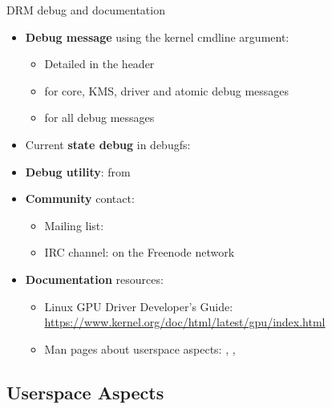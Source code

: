 \begin{frame}[fragile]{DRM debug and documentation}
  \begin{itemize}
  \item \textbf{Debug message} using the  kernel cmdline argument:
    \begin{itemize}
    \item Detailed in the  header
    \item {} for core, KMS, driver and atomic debug messages
    \item {} for all debug messages
    \end{itemize}
  \item Current \textbf{state debug} in debugfs:\\
  \item \textbf{Debug utility}:  from 
  \item \textbf{Community} contact:
    \begin{itemize}
    \item Mailing list: 
    \item IRC channel:  on the Freenode network
    \end{itemize}
  \item \textbf{Documentation} resources:
    \begin{itemize}
    \item Linux GPU Driver Developer’s Guide: \url{https://www.kernel.org/doc/html/latest/gpu/index.html}
    \item Man pages about userspace aspects: , , 
    \end{itemize}
  \end{itemize}
\end{frame}


\subsection{Userspace Aspects}

